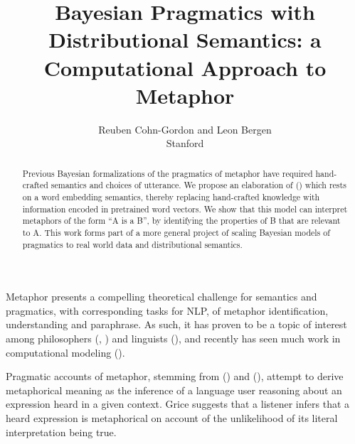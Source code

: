\documentclass[10pt,letterpaper,twocolumn]{article}
\title{Bayesian Pragmatics with Distributional Semantics: a Computational Approach to Metaphor}
\author{Reuben Cohn-Gordon and Leon Bergen \\ Stanford}
\date{}
\begin{document}
\maketitle



\begin{abstract}
\small
Previous Bayesian formalizations of the pragmatics of metaphor have required hand-crafted semantics and choices of utterance. We propose an elaboration of (\cite{kao}) which rests on a word embedding semantics, thereby replacing hand-crafted knowledge with information encoded in pretrained word vectors. We show that this model can interpret metaphors of the form ``A is a B'', by identifying the properties of B that are relevant to A. This work forms part of a more general project of scaling Bayesian models of pragmatics to real world data and distributional semantics.
\end{abstract}





Metaphor presents a compelling theoretical challenge for semantics and pragmatics, with corresponding tasks for NLP, of metaphor identification, understanding and paraphrase. As such, it has proven to be a topic of interest among philosophers (\cite{black}, \cite{davidson}) and linguists (\cite{lakoff2008metaphors}), and recently has seen much work in computational modeling (\cite{shutova2016design}). 


Pragmatic accounts of metaphor, stemming from (\cite{davidson}) and (\cite{grice}), attempt to derive metaphorical meaning as the inference of a language user reasoning about an expression heard in a given context. Grice suggests that a listener infers that a heard expression is metaphorical on account of the unlikelihood of its literal interpretation being true.
\end{document}
